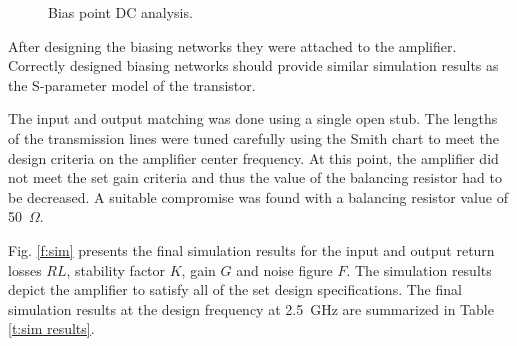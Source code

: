 \documentclass[a4paper, 12pt]{article}
\begin{document}
\begin{figure}[!h]
	\centering
	\caption{Bias point DC analysis.}
	\label{f:bias}
\end{figure}

After designing the biasing networks they were attached to the amplifier. 
Correctly designed biasing networks should provide similar simulation results 
as the S-parameter model of the transistor.

The input and output matching was done using a single open stub. The lengths 
of the transmission lines were tuned carefully using the Smith chart to meet 
the design criteria on the amplifier center frequency. At this point, the 
amplifier did not meet the set gain criteria and thus the value of the balancing 
resistor had to be decreased. A suitable compromise was found with a balancing 
resistor value of 50~$\Omega$. 

Fig. \ref{f:sim} presents the final simulation results for the input 
and output return losses $RL$, stability factor $K$, gain $G$ and noise figure 
$F$. The simulation results depict the amplifier to satisfy all of the set design 
specifications. The final simulation results at the design frequency at 2.5~GHz are summarized in Table \ref{t:sim results}.
\end{document}
